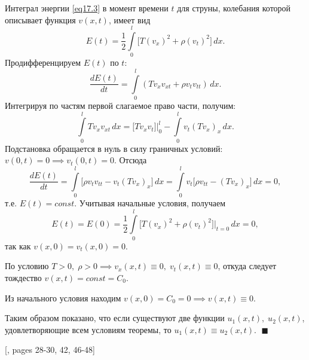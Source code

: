 Интеграл энергии \eqref{eq17.3} в момент времени $t$ для струны, колебания которой описывает функция $v(x,t)$, имеет вид
$$
 E(t) = \frac{1}{2}\int\limits_0^l \big[T (v_x)^2  + \rho (v_t)^2\big]\, dx. 
$$
Продифференцируем $E(t)$ по $t$:
$$
\frac{d E(t)}{dt} = \int\limits_0^l (T v_x v_{xt} + \rho v_t v_{tt}) \, dx.
$$
Интегрируя по частям первой слагаемое право части, получим:
$$
\int\limits_0^l T v_x v_{xt} \, dx = \big[ T v_x v_t\big]\bigg|_0^l - \int\limits_0^l v_t (T v_x)_x \, dx.
$$
Подстановка обращается в нуль в силу граничных условий: $v(0, t) = 0 \implies v_t(0,t) = 0$. Отсюда 
$$
\frac{d E(t)}{dt} = \int\limits_0^l \big[\rho v_t v_{tt} - v_t (T v_x)_x \big]\,dx = \int\limits_0^l v_t \big[\rho v_{tt} - (T v_x)_x\big]\, dx = 0, 
$$
т.е. $E(t) = const$. Учитывая начальные условия, получаем 
$$
E(t) = E(0) = \frac{1}{2} \int\limits_0^l \big[ T (v_x)^2 + \rho (v_t)^2\big]\bigg|_{t=0}\,dx = 0,
$$
так как $v(x,0) = v_t(x, 0) = 0$. 

По условию $T > 0, \; \rho >0 \implies v_x(x,t) \equiv 0, \; v_t(x,t) \equiv 0$, откуда следует тождество $v(x,t) = const = C_0$. 

Из начального условия находим $v(x, 0) = C_0 = 0 \implies v(x,t) \equiv 0$. 

Таким образом показано, что если существуют две функции $u_1(x,t),\;u_2(x,t)$, удовлетворяющие всем условиям теоремы, то $u_1(x,t) \equiv u_2(x,t)$. $\;\blacksquare$
\setcounter{equation}{0}

[\cite{urmati_tikhonov}, pages 28-30, 42, 46-48]